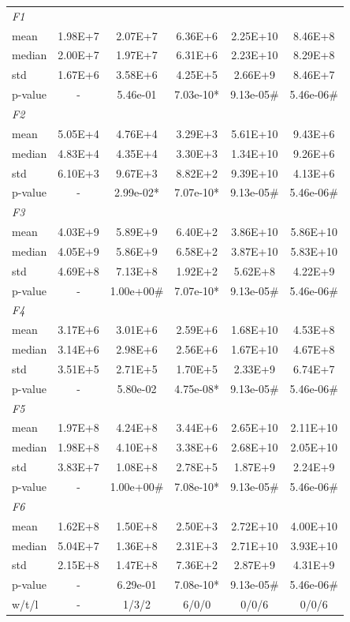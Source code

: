 \documentclass[12pt]{ctexart}
\begin{document}
{\begin{longtable}{lccccc}
\multicolumn{6}{l}{\textit{F1}} \\
mean & 1.98E+7 & 2.07E+7 & 6.36E+6 & 2.25E+10 & 8.46E+8 \\
median & 2.00E+7 & 1.97E+7 & 6.31E+6 & 2.23E+10 & 8.29E+8 \\
std & 1.67E+6 & 3.58E+6 & 4.25E+5 & 2.66E+9 & 8.46E+7 \\
p-value & - & 5.46e-01 & 7.03e-10* & 9.13e-05\# & 5.46e-06\# \\
\hline
\multicolumn{6}{l}{\textit{F2}} \\
mean & 5.05E+4 & 4.76E+4 & 3.29E+3 & 5.61E+10 & 9.43E+6 \\
median & 4.83E+4 & 4.35E+4 & 3.30E+3 & 1.34E+10 & 9.26E+6 \\
std & 6.10E+3 & 9.67E+3 & 8.82E+2 & 9.39E+10 & 4.13E+6 \\
p-value & - & 2.99e-02* & 7.07e-10* & 9.13e-05\# & 5.46e-06\# \\
\hline
\multicolumn{6}{l}{\textit{F3}} \\
mean & 4.03E+9 & 5.89E+9 & 6.40E+2 & 3.86E+10 & 5.86E+10 \\
median & 4.05E+9 & 5.86E+9 & 6.58E+2 & 3.87E+10 & 5.83E+10 \\
std & 4.69E+8 & 7.13E+8 & 1.92E+2 & 5.62E+8 & 4.22E+9 \\
p-value & - & 1.00e+00\# & 7.07e-10* & 9.13e-05\# & 5.46e-06\# \\
\hline
\multicolumn{6}{l}{\textit{F4}} \\
mean & 3.17E+6 & 3.01E+6 & 2.59E+6 & 1.68E+10 & 4.53E+8 \\
median & 3.14E+6 & 2.98E+6 & 2.56E+6 & 1.67E+10 & 4.67E+8 \\
std & 3.51E+5 & 2.71E+5 & 1.70E+5 & 2.33E+9 & 6.74E+7 \\
p-value & - & 5.80e-02 & 4.75e-08* & 9.13e-05\# & 5.46e-06\# \\
\hline
\multicolumn{6}{l}{\textit{F5}} \\
mean & 1.97E+8 & 4.24E+8 & 3.44E+6 & 2.65E+10 & 2.11E+10 \\
median & 1.98E+8 & 4.10E+8 & 3.38E+6 & 2.68E+10 & 2.05E+10 \\
std & 3.83E+7 & 1.08E+8 & 2.78E+5 & 1.87E+9 & 2.24E+9 \\
p-value & - & 1.00e+00\# & 7.08e-10* & 9.13e-05\# & 5.46e-06\# \\
\hline
\multicolumn{6}{l}{\textit{F6}} \\
mean & 1.62E+8 & 1.50E+8 & 2.50E+3 & 2.72E+10 & 4.00E+10 \\
median & 5.04E+7 & 1.36E+8 & 2.31E+3 & 2.71E+10 & 3.93E+10 \\
std & 2.15E+8 & 1.47E+8 & 7.36E+2 & 2.87E+9 & 4.31E+9 \\
p-value & - & 6.29e-01 & 7.08e-10* & 9.13e-05\# & 5.46e-06\# \\
\hline
w/t/l & - & 1/3/2 & 6/0/0 & 0/0/6 & 0/0/6 \\
\end{longtable}
}
\end{document}
